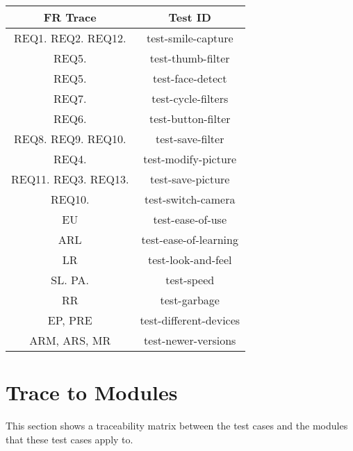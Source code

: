 \documentclass[12pt, titlepage]{article}
\begin{document}
\begin{center}
\begin{tabular}{ |c|c| } 
 \hline
 FR Trace & Test ID \\ 
  \hline
   \hline
    REQ1. REQ2. REQ12. & test-smile-capture \\ 
  \hline
    REQ5. & test-thumb-filter \\ 
 \hline
 REQ5. & test-face-detect \\ 
 \hline
 REQ7. & test-cycle-filters \\ 
 \hline
 REQ6. & test-button-filter \\ 
 \hline
 REQ8. REQ9. REQ10. & test-save-filter \\ 
 \hline
 REQ4. & test-modify-picture \\ 
 \hline
 REQ11. REQ3. REQ13. & test-save-picture \\ 
 \hline
 REQ10. & test-switch-camera \\ 
 \hline
 EU & test-ease-of-use \\ 
  \hline
ARL & test-ease-of-learning \\ 
  \hline
  LR & test-look-and-feel \\ 
  \hline
SL. PA. & test-speed \\ 
  \hline
RR & test-garbage \\ 
  \hline
EP, PRE & test-different-devices \\ 
  \hline
ARM, ARS, MR & test-newer-versions \\ 
 \hline
\end{tabular}
\end{center}

\section{Trace to Modules}
This section shows a traceability matrix between the test cases and the modules that these test cases apply to.
\end{document}
